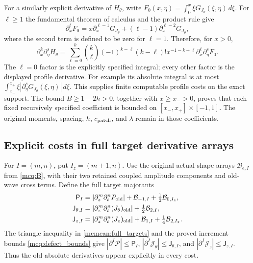 For a similarly explicit derivative of \(H_\theta\), write
\(F_0(x,\eta)=\int_0^x\xi G_{J_\theta}(\xi,\eta)\,d\xi\).
For \(\ell\ge1\) the fundamental theorem of calculus and the
product rule give
\[
 \partial_x^\ell F_0=x\partial_x^{\ell-1}G_{J_\theta}
              +(\ell-1)\partial_x^{\ell-2}G_{J_\theta},
\]
where the second term is defined to be zero for \(\ell=1\).
Therefore, for \(x>0\),
\begin{equation}\label{mcmean:H_derivatives}
 \partial_x^k\partial_\eta^sH_\theta
 =\sum_{\ell=0}^k\binom k\ell(-1)^{k-\ell}(k-\ell)!
    x^{-1-k+\ell}\partial_x^\ell\partial_\eta^sF_0.
\end{equation}
The \(\ell=0\) factor is the explicitly specified integral; every
other factor is the displayed profile derivative. For example its
absolute integral is at most
\(\int_{x_-}^{x_+}\xi|\partial_\eta^sG_{J_\theta}(\xi,\eta)|\,d\xi\).
This supplies finite computable profile costs on the exact support.
The bound \(B\ge1-2h>0\), together with \(x\ge x_->0\), proves
that each fixed recursively specified coefficient is bounded on
\([x_-,x_+]\times[-1,1]\). The original moments, spacing, \(h\),
\(c_{\rm patch}\), and \(\lambda\) remain in those coefficients.

\subsection{Explicit costs in full target derivative arrays}

For \(I=(m,n)\), put \(I_z=(m+1,n)\). Use the original actual-shape
arrays \(\mathcal B_{e,I}\) from \eqref{mcq:B}, with their two
retained coupled amplitude components and old-wave cross terms.
Define the full target majorants
\begin{equation}\label{mcmean:target_arrays}
\begin{split}
 \mathsf P_I&=|\partial_z^m\partial_t^nP_{\rm old}|
          +\mathcal B_{-1,I}+\tfrac12\mathcal B_{0,I_z},\\
 \mathsf J_{\theta,I}
      &=|\partial_z^m\partial_t^n(J_\theta)_{\rm old}|
          +\tfrac12\mathcal B_{2,I},\\
 \mathsf J_{z,I}
      &=|\partial_z^m\partial_t^n(J_z)_{\rm old}|
          +\mathcal B_{1,I}+\tfrac14\mathcal B_{2,I_z}.
\end{split}
\end{equation}
The triangle inequality in \eqref{mcmean:full_targets} and the
proved increment bounds \eqref{mcq:defect_bounds} give
\(|\partial^I\mathcal P|\le\mathsf P_I\),
\(|\partial^I\mathcal J_\theta|\le\mathsf J_{\theta,I}\), and
\(|\partial^I\mathcal J_z|\le\mathsf J_{z,I}\).
Thus the old absolute derivatives appear explicitly in every cost.

